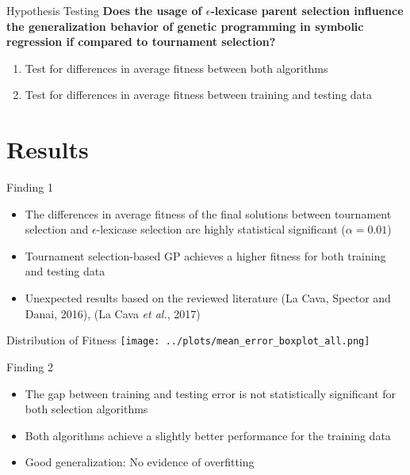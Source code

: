 \documentclass[
  ignorenonframetext,
]{beamer}
\providecommand{\tightlist}{%
  \setlength{\itemsep}{0pt}\setlength{\parskip}{0pt}}
\begin{document}
\begin{frame}{Hypothesis Testing}
\protect\hypertarget{hypothesis-testing}{}
\textbf{Does the usage of \(\epsilon\)-lexicase parent selection
influence the generalization behavior of genetic programming in symbolic
regression if compared to tournament selection?}

\begin{enumerate}
\tightlist
\item
  Test for differences in average fitness between both algorithms
\item
  Test for differences in average fitness between training and testing
  data
\end{enumerate}
\end{frame}

\hypertarget{results}{%
\section{Results}\label{results}}

\begin{frame}{Finding 1}
\protect\hypertarget{finding-1}{}
\begin{itemize}
\tightlist
\item
  The differences in average fitness of the final solutions between
  tournament selection and \(\epsilon\)-lexicase selection are highly
  statistical significant (\(\alpha=0.01\))
\item
  Tournament selection-based GP achieves a higher fitness for both
  training and testing data
\item
  Unexpected results based on the reviewed literature (La Cava, Spector
  and Danai, 2016), (La Cava \emph{et al.}, 2017)
\end{itemize}
\end{frame}

\begin{frame}{Distribution of Fitness}
\protect\hypertarget{distribution-of-fitness}{}
\texttt{[image: ../plots/mean\_error\_boxplot\_all.png]}
\end{frame}

\begin{frame}{Finding 2}
\protect\hypertarget{finding-2}{}
\begin{itemize}
\tightlist
\item
  The gap between training and testing error is not statistically
  significant for both selection algorithms
\item
  Both algorithms achieve a slightly better performance for the training
  data
\item
  Good generalization: No evidence of overfitting
\end{itemize}
\end{frame}
\end{document}

